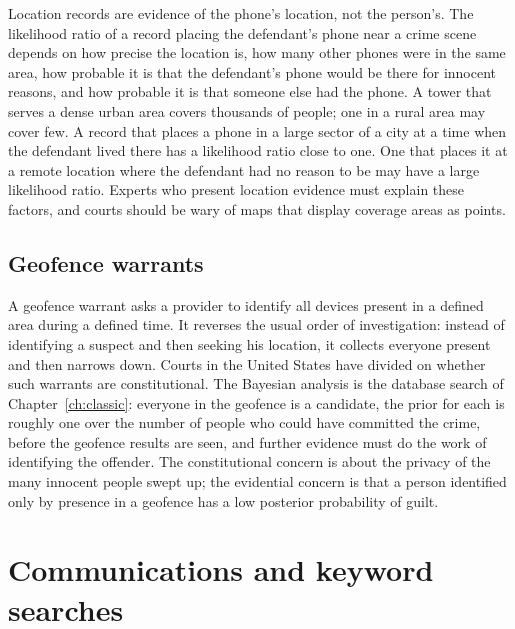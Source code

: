 Location records are evidence of the phone's location, not the person's. The likelihood ratio of a record placing the defendant's phone near a crime scene depends on how precise the location is, how many other phones were in the same area, how probable it is that the defendant's phone would be there for innocent reasons, and how probable it is that someone else had the phone. A tower that serves a dense urban area covers thousands of people; one in a rural area may cover few. A record that places a phone in a large sector of a city at a time when the defendant lived there has a likelihood ratio close to one. One that places it at a remote location where the defendant had no reason to be may have a large likelihood ratio. Experts who present location evidence must explain these factors, and courts should be wary of maps that display coverage areas as points.

\subsection{Geofence warrants}

A geofence warrant asks a provider to identify all devices present in a defined area during a defined time. It reverses the usual order of investigation: instead of identifying a suspect and then seeking his location, it collects everyone present and then narrows down. Courts in the United States have divided on whether such warrants are constitutional. The Bayesian analysis is the database search of Chapter~\ref{ch:classic}: everyone in the geofence is a candidate, the prior for each is roughly one over the number of people who could have committed the crime, before the geofence results are seen, and further evidence must do the work of identifying the offender. The constitutional concern is about the privacy of the many innocent people swept up; the evidential concern is that a person identified only by presence in a geofence has a low posterior probability of guilt.

\section{Communications and keyword searches}

